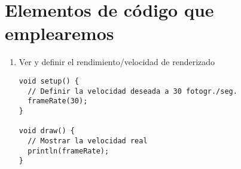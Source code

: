 \documentclass[a4paper,oneside]{article}
\begin{document}
\section{Elementos de código que emplearemos}
\begin{enumerate}
  \item Ver y definir el rendimiento/velocidad de renderizado

    \begin{verbatim}
void setup() {
  // Definir la velocidad deseada a 30 fotogr./seg.
  frameRate(30);
}

void draw() {
  // Mostrar la velocidad real
  println(frameRate);
}
    \end{verbatim}
\end{enumerate}
\end{document}
